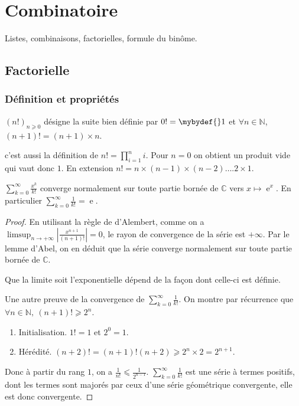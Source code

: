 
\section{Combinatoire}
Listes, combinaisons, factorielles, formule du binôme.
\subsection{Factorielle}
\subsubsection{Définition et propriétés}
\begin{definition}
[Factorielle] \((𝑛!)_{𝑛⩾0}\) désigne la suite bien définie par \(0!=\mybydef{}1\) et \(∀𝑛∈ℕ\), \((𝑛+1)!=(𝑛+1)\times 𝑛\).
\end{definition}
\begin{remark}
 c'est aussi la définition\footnotemark{} de \(𝑛!=∏
_{𝑖=1}^{𝑛}𝑖\). Pour \(𝑛=0\) on obtient un produit vide qui vaut donc \(1\). En extension
\(𝑛!=𝑛\times (𝑛-1)\times (𝑛-2)….2\times 1\).
\end{remark}
\begin{proposition}
\(∑_{𝑘=0}^{∞}\frac{𝑥^𝑘}{𝑘!}\) converge normalement sur toute partie bornée de \(ℂ\) vers \(𝑥↦\operatorname{e}^𝑥\). En particulier
\(∑_{𝑘=0}^{∞}\frac{1}{𝑘!}=\operatorname{e}\).
\end{proposition}
\begin{proof}
En utilisant la règle de d’Alembert, comme on a \(\limsup_{𝑛→+∞}\left|\frac{𝑥^{𝑛+1}}{(𝑛+1)!}\right|=0\), le rayon
de convergence de la série est \(+∞\). Par le lemme d’Abel, on en déduit que la série converge normalement sur
toute partie bornée de \(ℂ\).

Que la limite soit l'exponentielle dépend de la façon dont celle-ci est définie.

Une autre preuve de la convergence de \(∑_{𝑘=0}^{∞}\frac{1}{𝑘!}\). On montre par récurrence que \(∀𝑛∈ℕ,\ (𝑛+1)!⩾2^{𝑛}\).
\begin{enumerate}
\item
Initialisation. \(1!=1\) et \(2^0=1\).
\item
Hérédité. \((𝑛+2)!=(𝑛+1)!(𝑛+2)⩾2^{𝑛}\times 2=2^{𝑛+1}\).
\end{enumerate}
Donc à partir du rang \(1\), on a \(\frac 1{𝑛!}⩽\frac 1{2^{𝑛-1}}\). \(∑_{𝑘=0}^{∞}\frac{1}{𝑘!}\) est une série à termes positifs,
dont les termes sont majorés par ceux d'une série géométrique convergente, elle est donc convergente.
\end{proof}
